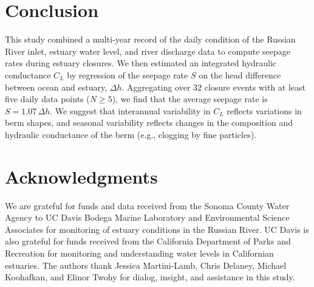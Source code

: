 \documentclass[preprint,12pt,authoryear]{elsarticle}
\begin{document}
\label{sec:discussion}

\section{Conclusion}

This study combined a multi-year record of the daily condition of the Russian River inlet, estuary water level, and river discharge data to compute seepage rates during estuary closures.
We then estimated an integrated hydraulic conductance $C_L$ by regression of the seepage rate $S$ on the head difference between ocean and estuary, $\Delta h$.
Aggregating over 32 closure events with at least five daily data points ($N \ge 5$), we find that the average seepage rate is $S = 1.07\,\Delta h$.
We suggest that interannual variability in $C_L$ reflects variations in berm shapes, and seasonal variability reflects changes in the composition and hydraulic conductance of the berm (e.g., clogging by fine particles).


\section{Acknowledgments}
We are grateful for funds and data received from the Sonoma County Water Agency to UC Davis Bodega Marine Laboratory and Environmental Science Associates for monitoring of estuary conditions in the Russian River. UC Davis is also grateful for funds received from the California Department of Parks and Recreation for monitoring and understanding water levels in Californian estuaries. The authors thank Jessica Martini-Lamb, Chris Delaney, Michael Koohafkan, and Elinor Twohy for dialog, insight, and assistance in this study.



\section*{}


\end{document}
